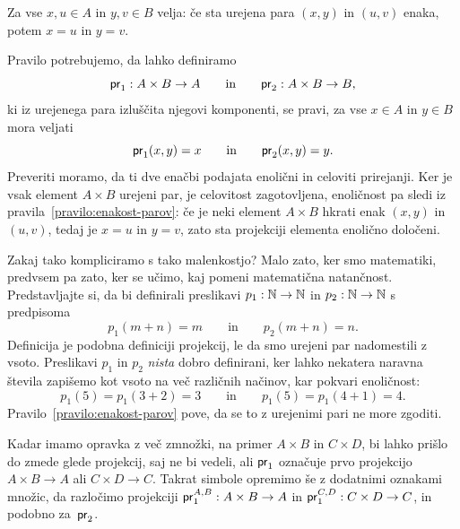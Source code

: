 \begin{pravilo}
  \label{pravilo:enakost-parov}
  Za vse $x, u \in A$ in $y, v \in B$ velja: če sta urejena para $(x, y)$ in $(u, v)$ enaka, potem $x = u$ in $y = v$.
\end{pravilo}

Pravilo potrebujemo, da lahko definiramo 
%
\begin{equation*}
  \fst : A \times B \to A
  \qquad\text{in}\qquad
  \snd : A \times B \to B,
\end{equation*}
%
ki iz urejenega para izluščita njegovi komponenti, se pravi, za vse $x \in A$ in $y \in B$ mora veljati
%
\begin{equation*}
  \fst(x, y) = x
  \qquad\text{in}\qquad
  \snd(x, y) = y.
\end{equation*}
%
Preveriti moramo, da ti dve enačbi podajata enolični in celoviti prirejanji.
%
Ker je vsak element $A \times B$ urejeni par, je celovitost zagotovljena,
enoličnost pa sledi iz pravila~\ref{pravilo:enakost-parov}:
če je neki element $A \times B$ hkrati enak $(x, y)$ in $(u, v)$, tedaj
je $x = u$ in $y = v$, zato sta projekciji elementa enolično določeni.

\begin{zgled}
  Zakaj tako kompliciramo s tako malenkostjo?
  Malo zato, ker smo matematiki, predvsem pa zato, ker se učimo, kaj pomeni matematična natančnost.
  Predstavljajte si, da bi definirali preslikavi $p_1 : \mathbb{N} \to \mathbb{N}$
  in $p_2 : \mathbb{N} \to \mathbb{N}$ s predpisoma
  \begin{equation*}
    p_1(m + n) = m
    \qquad\text{in}\qquad
    p_2(m + n) = n.
  \end{equation*}
  Definicija je podobna definiciji projekcij, le da smo urejeni par nadomestili z vsoto.
  Preslikavi $p_1$ in $p_2$ \emph{nista} dobro definirani, ker lahko nekatera naravna
  števila zapišemo kot vsoto na več različnih načinov, kar pokvari enoličnost:
  \begin{equation*}
    p_1(5) = p_1(3 + 2) = 3
    \qquad\text{in}\qquad
    p_1(5) = p_1(4 + 1) = 4.
  \end{equation*}
  Pravilo~\ref{pravilo:enakost-parov} pove, da se to z urejenimi pari ne more zgoditi.
\end{zgled}

Kadar imamo opravka z več zmnožki, na primer $A \times B$ in $C \times D$, bi lahko prišlo do zmede glede projekcij, saj ne bi vedeli, ali $\fst$ označuje prvo projekcijo $A \times B \to A$ ali $C \times D \to C$.
%
Takrat simbole opremimo še z dodatnimi oznakami množic, da
razločimo projekciji $\fst[A][B] : A \times B \to A$ in $\fst[C][D] : C \times D \to C$,
in podobno za~$\snd$.

